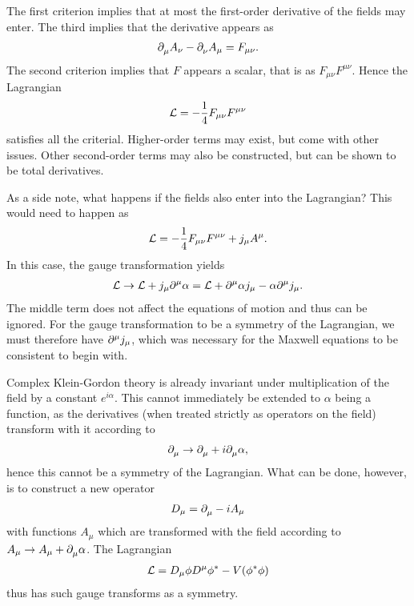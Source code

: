 The first criterion implies that at most the first-order derivative of the fields may enter. The third implies that the derivative appears as
\begin{align*}
	\del{\mu}{A_{\nu}} - \del{\nu}{A_{\mu}} = F_{\mu\nu}.
\end{align*}
The second criterion implies that $F$ appears a scalar, that is as $F_{\mu\nu}F^{\mu\nu}$. Hence the Lagrangian
\begin{align*}
	\lag = -\frac{1}{4}F_{\mu\nu}F^{\mu\nu}
\end{align*}
satisfies all the criterial. Higher-order terms may exist, but come with other issues. Other second-order terms may also be constructed, but can be shown to be total derivatives.

As a side note, what happens if the fields also enter into the Lagrangian? This would need to happen as
\begin{align*}
	\lag = -\frac{1}{4}F_{\mu\nu}F^{\mu\nu} + j_{\mu}A^{\mu}.
\end{align*}
In this case, the gauge transformation yields
\begin{align*}
	\lag \to \lag + j_{\mu}\del[\mu]{}{\alpha} = \lag + \del[\mu]{}{\alpha j_{\mu}} - \alpha\del[\mu]{}{j_{\mu}}.
\end{align*}
The middle term does not affect the equations of motion and thus can be ignored. For the gauge transformation to be a symmetry of the Lagrangian, we must therefore have $\del[\mu]{}{j_{\mu}}$, which was necessary for the Maxwell equations to be consistent to begin with.

Complex Klein-Gordon theory is already invariant under multiplication of the field by a constant $e^{i\alpha}$. This cannot immediately be extended to $\alpha$ being a function, as the derivatives (when treated strictly as operators on the field) transform with it according to
\begin{align*}
	\del{\mu}{} \to \del{\mu}{} + i\del{\mu}{\alpha},
\end{align*}
hence this cannot be a symmetry of the Lagrangian. What can be done, however, is to construct a new operator
\begin{align*}
	D_{\mu} = \del{\mu}{} - iA_{\mu}
\end{align*}
with functions $A_{\mu}$ which are transformed with the field according to $A_{\mu} \to A_{\mu} + \del{\mu}{\alpha}$. The Lagrangian
\begin{align*}
	\lag = D_{\mu}\phi D^{\mu}\cc{\phi} - V(\cc{\phi}\phi)
\end{align*}
thus has such gauge transforms as a symmetry.

